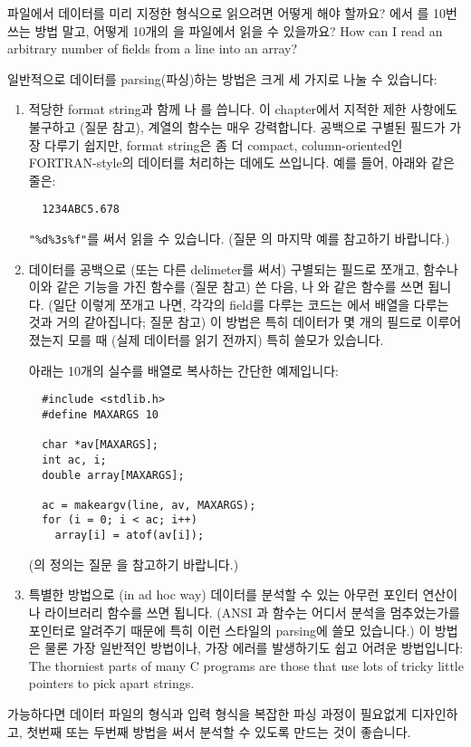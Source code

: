 \begin{faq}
	파일에서 데이터를 미리 지정한 형식으로 읽으려면 어떻게 해야 할까요?
	에서 를 10번 쓰는 방법 말고, 어떻게 10개의 
	을 파일에서 읽을 수 있을까요?
	How can I read an arbitrary number of fields from a line into an array?

\A
	일반적으로 데이터를 parsing(파싱)하는 방법은 크게 세 가지로 나눌 수
	있습니다:
\begin{enumerate}
\item
	적당한 format string과 함께 나 를 씁니다.
	이 chapter에서 지적한 제한 사항에도 불구하고 (질문  참고),
	 계열의 함수는 매우 강력합니다.
	공백으로 구별된 필드가 가장 다루기 쉽지만,  format string은
	좀 더 compact, column-oriented인 FORTRAN-style의 데이터를 처리하는
	데에도 쓰입니다.  예를 들어, 아래와 같은 줄은:
\begin{verbatim}
  1234ABC5.678
\end{verbatim}
	\verb+"%d%3s%f"+를 써서
	읽을 수 있습니다. (질문 의 마지막 예를 참고하기 바랍니다.)
	
\item
	데이터를 공백으로 (또는 다른 delimeter를 써서) 구별되는 필드로 쪼개고,
	 함수나 이와 같은 기능을 가진 함수를 (질문  참고) 쓴
	다음, 나 와 같은 함수를 쓰면 됩니다.
	(일단 이렇게 쪼개고 나면, 각각의 field를 다루는 코드는 에서
	 배열을 다루는 것과 거의 같아집니다; 질문  참고)
	이 방법은 특히 데이터가 몇 개의 필드로 이루어졌는지 모를 때
	(실제 데이터를 읽기 전까지) 특히 쓸모가 있습니다.

	아래는 10개의 실수를 배열로 복사하는 간단한 예제입니다:
\begin{verbatim}
  #include <stdlib.h>
  #define MAXARGS 10

  char *av[MAXARGS];
  int ac, i;
  double array[MAXARGS];

  ac = makeargv(line, av, MAXARGS);
  for (i = 0; i < ac; i++)
    array[i] = atof(av[i]);
\end{verbatim}
	(의 정의는 질문 을 참고하기 바랍니다.)

\item
	특별한 방법으로 (in ad hoc way) 데이터를 분석할 수 있는 아무런
	포인터 연산이나 라이브러리 함수를 쓰면 됩니다.
	(ANSI 과  함수는 어디서 분석을 멈추었는가를
	포인터로 알려주기 때문에 특히 이런 스타일의 parsing에 쓸모 있습니다.)
	이 방법은 물론 가장 일반적인 방법이나, 가장 에러를 발생하기도 쉽고
	어려운 방법입니다: The thorniest parts of many C programs are
	those that use lots of tricky little pointers to pick apart strings.
\end{enumerate}

	가능하다면 데이터 파일의 형식과 입력 형식을 복잡한 파싱 과정이
	필요없게 디자인하고, 첫번째 또는 두번째 방법을 써서 분석할 수 있도록
	만드는 것이 좋습니다.

\end{faq}


